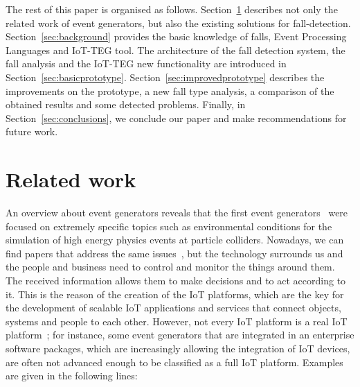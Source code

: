 \documentclass[review]{elsarticle}
\begin{document}
The rest of this paper is organised as follows. Section~\ref{sec:relatedwork}
describes not only the related work of event generators, but also the existing
solutions for fall-detection. Section~\ref{sec:background} provides the basic
knowledge of falls, Event Processing Languages and IoT-TEG tool. The architecture
of the fall detection system, the fall analysis and the IoT-TEG new functionality are 
introduced in Section~\ref{sec:basicprototype}. Section~\ref{sec:improvedprototype}
describes the improvements on the prototype, a new fall type analysis,
a comparison of the obtained results and some detected problems. Finally, in Section~\ref{sec:conclusions}, 
we conclude our paper and make recommendations for future work.

\section{Related work}
\label{sec:relatedwork}

An overview about event generators reveals that the first event generators~\cite{dobbs2004houches,mangano2005tools}
were focused on extremely specific topics such as environmental conditions for the simulation of high energy 
physics events at particle colliders. Nowadays, we can find papers that address the same issues~\cite{Grzegorczyk}, but 
the technology surrounds us and the people and business need to control and monitor the things around them. 
The received information allows them to make decisions and to act according to it. This is the reason 
of the creation of the IoT platforms, which are the key for the development of scalable IoT applications and 
services that connect objects, systems and people to each other. However, not every IoT platform is a real IoT 
platform~\cite{iot-analytics:2015}; for instance, some event generators that are integrated in an enterprise 
software packages, which are increasingly allowing the integration of IoT devices, are often not advanced enough
to be classified as a full IoT platform. Examples are given in the following lines:
\end{document}
